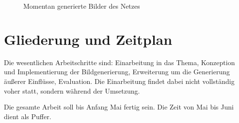 \documentclass{scrartcl}
\begin{document}
\begin{figure}[h]
\begin{subfigure}[b]{0.13\textwidth}
		\caption{}
		\label{fig:gtrsb-paper-bsp-image-4}
	\end{subfigure}
	\caption{Momentan generierte Bilder des Netzes}
	\label{fig:gtrsb-paper-bsp-images}
\end{figure}



\section{Gliederung und Zeitplan}
Die wesentlichen Arbeitschritte sind: Einarbeitung in das Thema, Konzeption und Implementierung der Bildgenerierung, Erweiterung um die Generierung äußerer Einflüsse, Evaluation. Die Einarbeitung findet dabei nicht vollständig voher statt, sondern während der Umsetzung.

Die gesamte Arbeit soll bis Anfang Mai fertig sein. Die Zeit von Mai bis Juni dient als Puffer.
\end{document}
